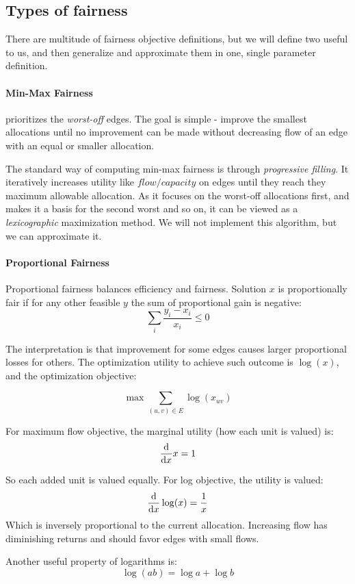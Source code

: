 \documentclass[12pt, openany]{article}
\begin{document}
\subsection{Types of fairness}
There are multitude of fairness objective definitions, but we will define two useful to us, and then generalize and approximate them in one, single parameter definition.\cite{paschos_allocation_fairness}

\paragraph{\textbf{Min-Max Fairness}} prioritizes the \textit{worst-off} edges. The goal is simple - improve the smallest allocations until no improvement can be made without decreasing flow of an edge with an equal or smaller allocation.

The standard way of computing min-max fairness is through \textit{progressive filling}. It iteratively increases utility like \(flow / capacity\) on edges until they reach they maximum allowable allocation. As it focuses on the worst-off allocations first, and makes it a basis for the second worst and so on, it can be viewed as a \textit{lexicographic} maximization method. We will not implement this algorithm, but we can approximate it.

\paragraph{Proportional Fairness}

Proportional fairness balances efficiency and fairness. Solution $x$ is proportionally fair if for any other feasible $y$ the sum of proportional gain is negative:
\[
\sum_i \frac{y_i - x_i}{x_i} \le 0
\]

The interpretation is that improvement for some edges causes larger proportional losses for others. The optimization utility to achieve such outcome is $\log(x)$, and the optimization objective:

\[
\max \sum_{(u,v)\in E}\log(x_{uv})
\]

For maximum flow objective, the marginal utility (how each unit is valued) is:
\[
\dv{}{x} x = 1
\]

So each added unit is valued equally. For log objective, the utility is valued:
\[
\dv{}{x} \log(x)=\frac{1}{x}
\]
Which is inversely proportional to the current allocation. Increasing flow has diminishing returns and should favor edges with small flows.

Another useful property of logarithms is:
\[
\log(ab)=\log a + \log b
\]
\end{document}
